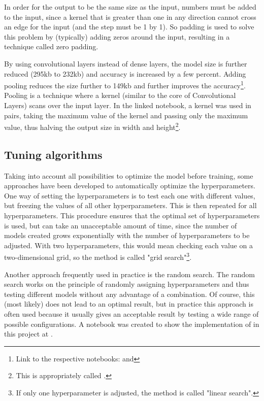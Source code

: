 In order for the output to be the same size as the input, numbers must be added to the input, since a kernel that is greater than one in any direction cannot cross an edge for the input (and the step must be 1 by 1).
So padding is used to solve this problem by (typically) adding zeros around the input, resulting in a technique called zero padding.

By using convolutional layers instead of dense layers, the model size is further reduced (295kb to 232kb) and accuracy is increased by a few percent. Adding pooling reduces the size further to 149kb and further improves the accuracy\footnote{Link to the respective notebooks:  and }.
Pooling is a technique where a kernel (similar to the core of Convolutional Layers) scans over the input layer.
In the linked notebook, a kernel was used in pairs, taking the maximum value of the kernel and passing only the maximum value, thus halving the output size in width and height\footnote{This is appropriately called .}.

\subsection{Tuning algorithms}

Taking into account all possibilities to optimize the model before training, some approaches have been developed to automatically optimize the hyperparameters.
One way of setting the hyperparameters is to test each one with different values, but freezing the values of all other hyperparameters.
This is then repeated for all hyperparameters.
This procedure ensures that the optimal set of hyperparameters is used, but can take an unacceptable amount of time, since the number of models created grows exponentially with the number of hyperparameters to be adjusted.
With two hyperparameters, this would mean checking each value on a two-dimensional grid, so the method is called "grid search"\footnote{If only one hyperparameter is adjusted, the method is called "linear search".}.

Another approach frequently used in practice is the random search.
The random search works on the principle of randomly assigning hyperparameters and thus testing different models without any advantage of a combination.
Of course, this (most likely) does not lead to an optimal result, but in practice this approach is often used because it usually gives an acceptable result by testing a wide range of possible configurations.
A notebook was created to show the implementation of  in this project at .

